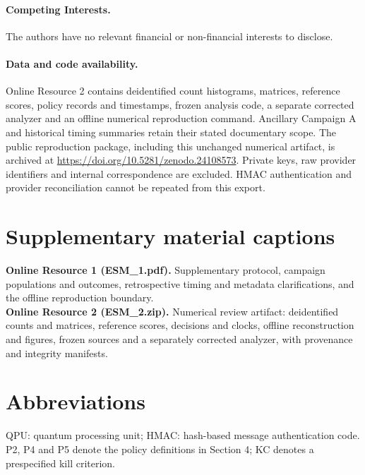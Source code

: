 \documentclass[pdflatex,sn-mathphys-num]{sn-jnl}
\begin{document}
\paragraph{Competing Interests.} The authors have no relevant financial or non-financial interests to disclose.
{}
\paragraph{Data and code availability.} Online Resource 2 contains deidentified count histograms, matrices, reference scores, policy records and timestamps, frozen analysis code, a separate corrected analyzer and an offline numerical reproduction command. Ancillary Campaign A and historical timing summaries retain their stated documentary scope. The public reproduction package, including this unchanged numerical artifact, is archived at \url{https://doi.org/10.5281/zenodo.24108573}. Private keys, raw provider identifiers and internal correspondence are excluded. HMAC authentication and provider reconciliation cannot be repeated from this export.

\section*{Supplementary material captions}
\noindent\textbf{Online Resource 1 (ESM\_1.pdf).} Supplementary protocol, campaign populations and outcomes, retrospective timing and metadata clarifications, and the offline reproduction boundary.\\
\textbf{Online Resource 2 (ESM\_2.zip).} Numerical review artifact: deidentified counts and matrices, reference scores, decisions and clocks, offline reconstruction and figures, frozen sources and a separately corrected analyzer, with provenance and integrity manifests.

\section*{Abbreviations}
QPU: quantum processing unit; HMAC: hash-based message authentication code. P2, P4 and P5 denote the policy definitions in Section 4; KC denotes a prespecified kill criterion.
{
}
\end{document}
